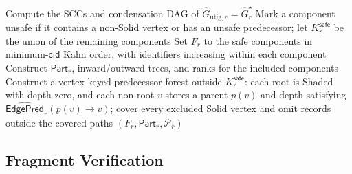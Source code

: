 \begin{algorithm}[h!]
\caption{\textsc{SafeExtract}: Expanded Safe Extraction}
\label{alg:safe-extract}
\footnotesize
{}
Compute the SCCs and condensation DAG of
$\widehat G_{\mathrm{utig},r}=\widehat G_r^\star$\;
Mark a component unsafe if it contains a non-Solid vertex or has an unsafe
predecessor; let $K_r^{\mathsf{safe}}$ be the union of the remaining components\;
Set $F_r$ to the safe components in minimum-$\mathsf{cid}$ Kahn order, with
identifiers increasing within each component\;
Construct $\mathsf{Part}_r$, inward/outward trees, and ranks for the included
components\;
Construct a vertex-keyed predecessor forest outside $K_r^{\mathsf{safe}}$:
each root is Shaded with depth zero, and each non-root $v$ stores a parent
$p(v)$ and depth satisfying $\widehat{\mathsf{EdgePred}}_r(p(v)\to v)$;
cover every excluded Solid vertex and omit records outside the covered paths\;
\KwRet $(F_r,\mathsf{Part}_r,\mathcal P_r)$
\end{algorithm}

\subsection{Fragment Verification}

